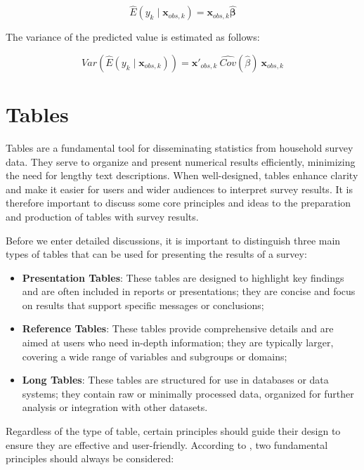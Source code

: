 \documentclass[
  12pt,
]{book}
\begin{document}
\[
\widehat{E}(y_{k}\mid\boldsymbol{x}_{obs,k}) = \boldsymbol{x}_{obs,k} \widehat{\boldsymbol{\beta}}
\]

The variance of the predicted value is estimated as follows:

\[
\widehat {Var} \left(\widehat{E}\left(y_{k}\mid \boldsymbol{x}_{obs,k}\right)\right) 
=  \boldsymbol{x}'_{obs,k} \ \widehat {Cov} \left(\widehat{\beta}\right) \ \boldsymbol{x}_{obs,k}
\]

\hypertarget{tables}{%
\chapter{Tables}\label{tables}}

Tables are a fundamental tool for disseminating statistics from household survey data. They serve to organize and present numerical results efficiently, minimizing the need for lengthy text descriptions. When well-designed, tables enhance clarity and make it easier for users and wider audiences to interpret survey results. It is therefore important to discuss some core principles and ideas to the preparation and production of tables with survey results.

Before we enter detailed discussions, it is important to distinguish three main types of tables that can be used for presenting the results of a survey:

\begin{itemize}
\item
  \textbf{Presentation Tables}: These tables are designed to highlight key findings and are often included in reports or presentations; they are concise and focus on results that support specific messages or conclusions;
\item
  \textbf{Reference Tables}: These tables provide comprehensive details and are aimed at users who need in-depth information; they are typically larger, covering a wide range of variables and subgroups or domains;
\item
  \textbf{Long Tables}: These tables are structured for use in databases or data systems; they contain raw or minimally processed data, organized for further analysis or integration with other datasets.
\end{itemize}

Regardless of the type of table, certain principles should guide their design to ensure they are effective and user-friendly. According to \citet{miller2004chicago}, two fundamental principles should always be considered:
\end{document}
